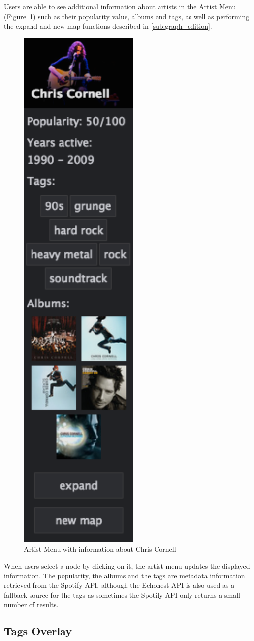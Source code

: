 \documentclass{article}
\begin{document}
      Users are able to see additional information about artists in the Artist Menu (Figure~\ref{fig:artist_menu}) such as their popularity value, albums and tags, as well as performing the expand and new map functions described in \ref{sub:graph_edition}.
      \begin{figure}[th]
        \begin{center}
          \includegraphics[width=0.2\columnwidth]{../report/figures/artist_menu.pdf}
        \end{center}
        \caption{Artist Menu with information about Chris Cornell}
        \label{fig:artist_menu}
      \end{figure}
      When users select a node by clicking on it, the artist menu updates the displayed information.
      The popularity, the albums and the tags are metadata information retrieved from the Spotify API, although the Echonest API is also used as a fallback source for the tags  as sometimes the Spotify API only returns a small number of results.

    \subsection{Tags Overlay}
    \label{sub:tags_overlay}
    
\end{document}
